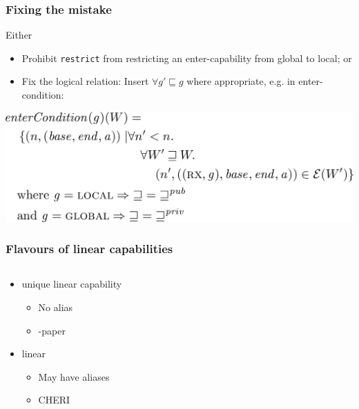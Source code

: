 \documentclass[14pt]{beamer}
\begin{document}
\begin{frame}
  \frametitle{Fixing the mistake}
  Either
  \begin{itemize}
  \item Prohibit \texttt{restrict} from restricting an enter-capability from global to local; or
  \item Fix the logical relation:
    Insert $\forall g' \sqsubseteq g$ where appropriate, e.g. in enter-condition:
  \end{itemize}
  \vspace{1em}
  \includegraphics[width=\textwidth]{econd}
\end{frame}

\begin{frame}
  \frametitle{Flavours of linear capabilities}
  \begin{columns}
\begin{column}{.7\textwidth}
  \begin{itemize}
  \item unique linear capability\\
    \begin{itemize}
    \item No alias
    \item \stktokens{}-paper
  \end{itemize}
\item linear\\
  \begin{itemize}
  \item May have aliases
  \item CHERI
  \end{itemize}
  \end{itemize}
\end{column}
\begin{column}{.3\textwidth}
\end{column}
\end{columns}
\end{frame}
\end{document}
